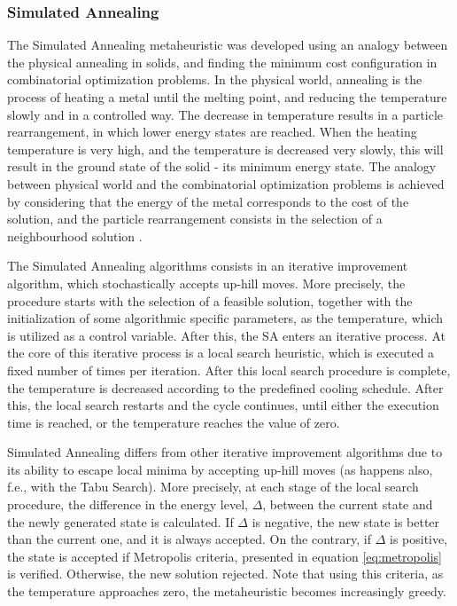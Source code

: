 \subsubsection{Simulated Annealing}
\label{sec:sa_lr}

The Simulated Annealing metaheuristic was developed using an analogy between the physical annealing in solids, and finding the minimum cost configuration in combinatorial optimization problems. In the physical world, annealing is the process of heating a metal until the melting point,  and reducing the temperature slowly and in a controlled way. The decrease in temperature results in a particle rearrangement, in which lower energy states are reached. When the heating temperature is very high, and the temperature is decreased very slowly, this will result in the ground state of the solid - its minimum energy state. The analogy between physical world and the combinatorial optimization problems is achieved by considering that the energy of the metal corresponds to the cost of the solution, and the particle rearrangement consists in the selection of a neighbourhood solution \cite{simulated_annealing_1}.

The Simulated Annealing algorithms consists in an iterative improvement algorithm, which stochastically accepts up-hill moves. More precisely, the procedure starts with the selection of a feasible solution, together with the initialization of some algorithmic specific parameters, as the temperature, which is utilized as a control variable. After this, the SA enters an iterative process. At the core of this iterative process is a local search heuristic, which is executed a fixed number of times per iteration. After this local search procedure is complete, the temperature is decreased according to the predefined cooling schedule. After this, the local search restarts and the cycle continues, until either the execution time is reached, or the temperature reaches the value of zero.

Simulated Annealing differs from other iterative improvement algorithms due to its ability to escape local minima by accepting up-hill moves (as happens also, f.e., with the Tabu Search). More precisely, at each stage of the local search procedure, the difference in the energy level, $\Delta$, between the current state and the newly generated state is calculated. If $\Delta$ is negative, the new state is better than the current one, and it is always accepted. On the contrary, if $\Delta$ is positive, the state is accepted if Metropolis criteria, presented in equation \ref{eq:metropolis} is verified. Otherwise, the new solution rejected. Note that using this criteria, as the temperature approaches zero, the metaheuristic becomes increasingly greedy.

